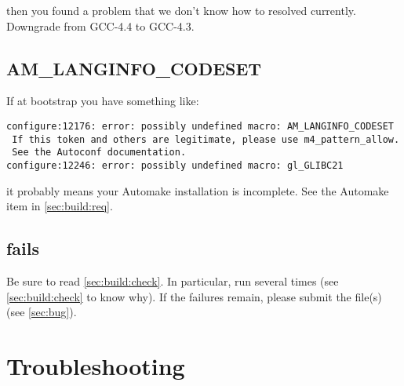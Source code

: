 \noindent
then you found a problem that we don't know how to resolved currently.
Downgrade from GCC-4.4 to GCC-4.3.

\subsection{AM\_LANGINFO\_CODESET}

If at bootstrap you have something like:

\begin{lstlisting}[language={}]
configure:12176: error: possibly undefined macro: AM_LANGINFO_CODESET
 If this token and others are legitimate, please use m4_pattern_allow.
 See the Autoconf documentation.
configure:12246: error: possibly undefined macro: gl_GLIBC21
\end{lstlisting}

\noindent
it probably means your Automake installation is incomplete.  See the
Automake item in \autoref{sec:build:req}.


\subsection{ fails}

Be sure to read \autoref{sec:build:check}.  In particular, run  several times (see \autoref{sec:build:check} to know why).  If the
failures remain, please submit the  file(s) (see
\autoref{sec:bug}).

\section{Troubleshooting}

